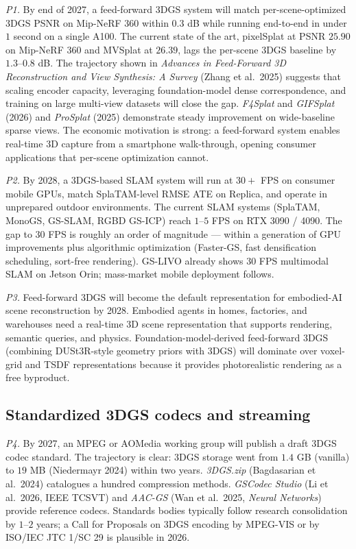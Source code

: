 \emph{P1.} By end of 2027, a feed-forward 3DGS system will match per-scene-optimized 3DGS PSNR on Mip-NeRF 360 within \(0.3\) dB while running end-to-end in under \(1\) second on a single A100. The current state of the art, pixelSplat at PSNR \(25.90\) on Mip-NeRF 360 and MVSplat at \(26.39\), lags the per-scene 3DGS baseline by \(1.3\)--\(0.8\) dB. The trajectory shown in \emph{Advances in Feed-Forward 3D Reconstruction and View Synthesis: A Survey} (Zhang et al.~2025) suggests that scaling encoder capacity, leveraging foundation-model dense correspondence, and training on large multi-view datasets will close the gap. \emph{F4Splat} and \emph{GIFSplat} (2026) and \emph{ProSplat} (2025) demonstrate steady improvement on wide-baseline sparse views. The economic motivation is strong: a feed-forward system enables real-time 3D capture from a smartphone walk-through, opening consumer applications that per-scene optimization cannot.

\emph{P2.} By 2028, a 3DGS-based SLAM system will run at \(30+\) FPS on consumer mobile GPUs, match SplaTAM-level RMSE ATE on Replica, and operate in unprepared outdoor environments. The current SLAM systems (SplaTAM, MonoGS, GS-SLAM, RGBD GS-ICP) reach \(1\)--\(5\) FPS on RTX 3090 / 4090. The gap to \(30\) FPS is roughly an order of magnitude --- within a generation of GPU improvements plus algorithmic optimization (Faster-GS, fast densification scheduling, sort-free rendering). GS-LIVO already shows \(30\) FPS multimodal SLAM on Jetson Orin; mass-market mobile deployment follows.

\emph{P3.} Feed-forward 3DGS will become the default representation for embodied-AI scene reconstruction by 2028. Embodied agents in homes, factories, and warehouses need a real-time 3D scene representation that supports rendering, semantic queries, and physics. Foundation-model-derived feed-forward 3DGS (combining DUSt3R-style geometry priors with 3DGS) will dominate over voxel-grid and TSDF representations because it provides photorealistic rendering as a free byproduct.

\subsection{Standardized 3DGS codecs and streaming}\label{standardized-3dgs-codecs-and-streaming}

\emph{P4.} By 2027, an MPEG or AOMedia working group will publish a draft 3DGS codec standard. The trajectory is clear: 3DGS storage went from \(1.4\) GB (vanilla) to \(19\) MB (Niedermayr 2024) within two years. \emph{3DGS.zip} (Bagdasarian et al.~2024) catalogues a hundred compression methods. \emph{GSCodec Studio} (Li et al.~2026, IEEE TCSVT) and \emph{AAC-GS} (Wan et al.~2025, \emph{Neural Networks}) provide reference codecs. Standards bodies typically follow research consolidation by \(1\)--\(2\) years; a Call for Proposals on 3DGS encoding by MPEG-VIS or by ISO/IEC JTC 1/SC 29 is plausible in 2026.

